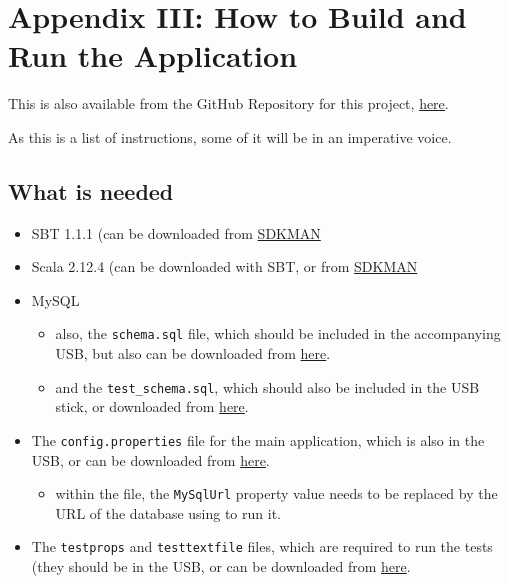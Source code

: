 \section{Appendix III: How to Build and Run the Application} \label{appendix3}

This is also available from the GitHub Repository for this project,
\href{https://github.com/claudiusbr/personal_finance_system}{here}.

As this is a list of instructions, some of it will be in an imperative voice.

\subsection{What is needed}
\begin{itemize}
  \item
    SBT 1.1.1 (can be downloaded from \href{http://sdkman.io/}{SDKMAN}

  \item
    Scala 2.12.4 (can be downloaded with SBT, or from
    \href{http://sdkman.io/}{SDKMAN}

  \item
    MySQL
    \begin{itemize}
      \item
        also, the \texttt{schema.sql} file, which should be included in the accompanying USB, but also can be downloaded from \href{https://github.com/claudiusbr/personal_finance_system/tree/master/code/original_db_schemas/mysql}{here}.

      \item
        and the \texttt{test\_schema.sql}, which should also be included in the USB stick, or downloaded from \href{https://github.com/claudiusbr/personal_finance_system/tree/master/code/original_db_schemas/mysql}{here}.
    \end{itemize}

  \item
    The \texttt{config.properties} file for the main application, which is also in the USB, or can be downloaded from \href{https://github.com/claudiusbr/personal_finance_system/tree/master/code}{here}.
    \begin{itemize}
      \item
        within the file, the \texttt{MySqlUrl} property value needs to be
        replaced by the URL of the database using to run it.
    \end{itemize}


  \item
    The \texttt{testprops} and \texttt{testtextfile} files, which are required
    to run the tests (they should be in the USB, or can be downloaded from
    \href{https://github.com/claudiusbr/personal_finance_system/tree/master/code/src/test}{here}.


\end{itemize}
